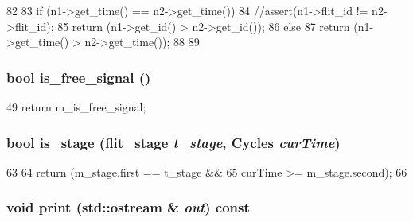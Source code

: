 \begin{DoxyCode}
82     {
83         if (n1->get_time() == n2->get_time()) {
84             //assert(n1->flit_id != n2->flit_id);
85             return (n1->get_id() > n2->get_id());
86         } else {
87             return (n1->get_time() > n2->get_time());
88         }
89     }
\end{DoxyCode}
\hypertarget{classflit__d_ae4729085999fb1d52c290270c08abbcf}{
\subsubsection[{is\_\-free\_\-signal}]{\setlength{\rightskip}{0pt plus 5cm}bool is\_\-free\_\-signal ()}}
\label{classflit__d_ae4729085999fb1d52c290270c08abbcf}



\begin{DoxyCode}
49 { return m_is_free_signal; }
\end{DoxyCode}
\hypertarget{classflit__d_a67dbc89734ed2920ed59fed25516e155}{
\subsubsection[{is\_\-stage}]{\setlength{\rightskip}{0pt plus 5cm}bool is\_\-stage ({\bf flit\_\-stage} {\em t\_\-stage}, \/  {\bf Cycles} {\em curTime})}}
\label{classflit__d_a67dbc89734ed2920ed59fed25516e155}



\begin{DoxyCode}
63     {
64         return (m_stage.first == t_stage &&
65                 curTime >= m_stage.second);
66     }
\end{DoxyCode}
\hypertarget{classflit__d_ac55fe386a101fbae38c716067c9966a0}{
\subsubsection[{print}]{\setlength{\rightskip}{0pt plus 5cm}void print (std::ostream \& {\em out}) const}}
\label{classflit__d_ac55fe386a101fbae38c716067c9966a0}



